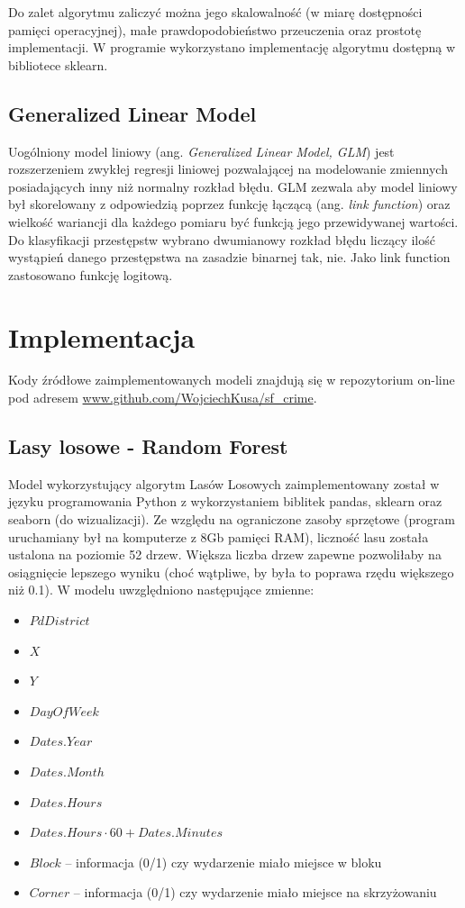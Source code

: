 \documentclass[11pt]{article} %
\begin{document}
Do zalet algorytmu zaliczyć można jego skalowalność (w miarę dostępności pamięci operacyjnej), małe prawdopodobieństwo przeuczenia oraz prostotę implementacji. W programie wykorzystano implementację algorytmu dostępną w bibliotece sklearn.


\subsection{Generalized Linear Model}

Uogólniony model liniowy (ang. \textit{Generalized Linear Model, GLM}) jest rozszerzeniem zwykłej regresji liniowej pozwalającej na modelowanie zmiennych posiadających inny niż normalny rozkład błędu. GLM zezwala aby model liniowy był skorelowany z odpowiedzią poprzez funkcję łączącą (ang. \textit{link function}) oraz wielkość wariancji dla każdego pomiaru być funkcją jego przewidywanej wartości. \\

Do klasyfikacji przestępstw wybrano dwumianowy rozkład błędu liczący ilość wystąpień danego przestępstwa na zasadzie binarnej {tak, nie}. Jako link function zastosowano funkcję logitową. \\

\section{Implementacja}

Kody źródłowe zaimplementowanych modeli znajdują się w repozytorium on-line pod adresem \url{www.github.com/WojciechKusa/sf_crime}. 

\subsection{Lasy losowe - Random Forest}

Model wykorzystujący algorytm Lasów Losowych zaimplementowany został w języku programowania Python z wykorzystaniem biblitek pandas, sklearn oraz seaborn (do wizualizacji). Ze względu na ograniczone zasoby sprzętowe (program uruchamiany był na komputerze z 8Gb pamięci RAM), liczność lasu została ustalona na poziomie 52 drzew. Większa liczba drzew zapewne pozwoliłaby na osiągnięcie lepszego wyniku (choć wątpliwe, by była to poprawa rzędu większego niż 0.1). W modelu uwzględniono następujące zmienne:

\begin{itemize}
\item $PdDistrict$
\item $X $
\item $Y $
\item $DayOfWeek$
\item $Dates.Year $
\item $Dates.Month $
\item $Dates.Hours $
\item $Dates.Hours \cdot 60 + Dates.Minutes$ 
\item $Block $ -- informacja (0/1) czy wydarzenie miało miejsce w bloku
\item $Corner $ -- informacja (0/1) czy wydarzenie miało miejsce na skrzyżowaniu
\end{itemize}
\end{document}
